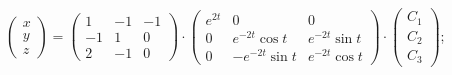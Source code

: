 \begin{enumsolsfull}
		\item \( \begin{pmatrix} x \\ y \\ z \end{pmatrix} = \begin{pmatrix} 1 & -1 & -1 \\ -1 & 1 & 0 \\ 2 & -1 & 0 \end{pmatrix} \cdot \begin{pmatrix} e^{2t} & 0 & 0 \\ 0 & e^{-2t} \cos{t} & e^{-2t} \sin{t} \\ 0 & -e^{-2t} \sin{t} & e^{-2t} \cos{t} \end{pmatrix} \cdot \begin{pmatrix} C_1 \\ C_2 \\ C_3 \end{pmatrix} \); %

\end{enumsolsfull}
